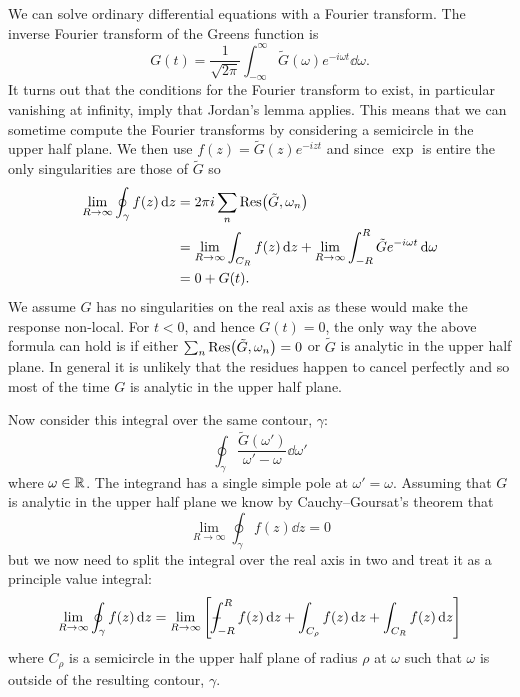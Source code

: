 \documentclass{article}
\newcommand{\pvint}{{-\mkern-19mu}\int}
\begin{document}
    We can solve ordinary differential equations with a Fourier transform.
    The inverse Fourier transform of the Greens function is
    \[G(t) = \frac{1}{\sqrt{2\pi}} \int_{-\infty}^{\infty} \tilde{G}(\omega) e^{-i\omega t} \dd{\omega}.\]
    It turns out that the conditions for the Fourier transform to exist, in particular vanishing at infinity, imply that Jordan's lemma applies.
    This means that we can sometime compute the Fourier transforms by considering a semicircle in the upper half plane.
    We then use \(f(z) = \tilde{G}(z)e^{-izt}\) and since \(\exp\) is entire the only singularities are those of \(\tilde{G}\) so
    \begin{align*}
        \lim_{R\to\infty} \oint_{\gamma} f(z) \dd{z} &= 2\pi i\sum_{n} \Res(\tilde{G}, \omega_n)\\
        &= \lim_{R\to\infty} \int_{C_R} f(z) \dd{z} + \lim_{R\to\infty}  \int_{-R}^{R} \tilde{G}e^{-i\omega t} \dd{\omega}\\
        &= 0 + G(t).
    \end{align*}
    We assume \(G\) has no singularities on the real axis as these would make the response non-local.
    For \(t < 0\), and hence \(G(t) = 0\), the only way the above formula can hold is if either \(\sum_{n}\Res(\tilde{G}, \omega_n) = 0\) or \(\tilde{G}\) is analytic in the upper half plane.
    In general it is unlikely that the residues happen to cancel perfectly and so most of the time \(G\) is analytic in the upper half plane.
    
    Now consider this integral over the same contour, \(\gamma\):
    \[\oint_{\gamma} \frac{\tilde{G}(\omega')}{\omega' - \omega}\dd{\omega'}\]
    where \(\omega\in\mathbb{R}\).
    The integrand has a single simple pole at \(\omega' = \omega\).
    Assuming that \(G\) is analytic in the upper half plane we know by Cauchy--Goursat's theorem that
    \[\lim_{R\to\infty} \oint_{\gamma} f(z) \dd{z} = 0\]
    but we now need to split the integral over the real axis in two and treat it as a principle value integral:
    \[\lim_{R\to\infty} \oint_{\gamma}f(z) \dd{z} = \lim_{R\to\infty} \left[ \pvint_{-R}^{R} f(z)\dd{z} + \int_{C_\rho} f(z)\dd{z} + \int_{C_R} f(z) \dd{z} \right]\]
    where \(C_\rho\) is a semicircle in the upper half plane of radius \(\rho\) at \(\omega\) such that \(\omega\) is outside of the resulting contour, \(\gamma\).
    
\end{document}
